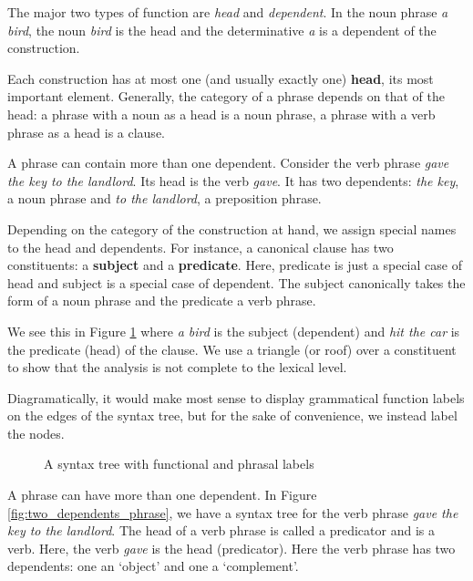 \documentclass{scrarticle}
\begin{document}
The major two types of function are \emph{head} and \emph{dependent}. In the noun phrase \emph{a
bird}, the noun \emph{bird} is the head and the determinative \emph{a} is a dependent of the
construction.

Each construction has at most one (and usually exactly one) \textbf{head}, its most important
element. Generally, the category of a phrase depends on that of the head: a phrase with a noun as a
head is a noun phrase, a phrase with a verb phrase as a head is a clause.

A phrase can contain more than one dependent. Consider the verb phrase \emph{gave the key to the
landlord}. Its head is the verb \emph{gave}. It has two dependents: \emph{the key}, a noun phrase
and \emph{to the landlord}, a preposition phrase.

Depending on the category of the construction at hand, we assign special names to the head and
dependents. For instance, a canonical clause has two constituents: a \textbf{subject} and a
\textbf{predicate}. Here, predicate is just a special case of head and subject is a special case of
dependent. The subject canonically takes the form of a noun phrase and the predicate a verb phrase.

We see this in Figure \ref{fig:abirdhitthecar_functional_phrasal} where \emph{a bird} is the subject
(dependent) and \emph{hit the car} is the predicate (head) of the clause. We use a triangle (or
roof) over a constituent to show that the analysis is not complete to the lexical level.

Diagramatically, it would make most sense to display grammatical function labels on the edges of the
syntax tree, but for the sake of convenience, we instead label the nodes.

\begin{figure}[ht]
    \caption{A syntax tree with functional and phrasal labels}
    \label{fig:abirdhitthecar_functional_phrasal}
\end{figure}

A phrase can have more than one dependent. In Figure \ref{fig:two_dependents_phrase}, we have a
syntax tree for the verb phrase \emph{gave the key to the landlord}. The head of a verb phrase is called
a predicator and is a verb. Here, the verb \emph{gave} is the head (predicator). Here the verb phrase has
two dependents: one an `object' and one a `complement'.
\end{document}
